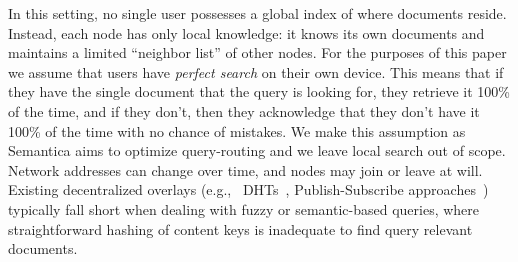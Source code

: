 \documentclass[10pt,journal]{IEEEtran}
\begin{document}
In this setting, no single user possesses a global index of where documents reside. Instead, each node has only local knowledge: it knows its own documents and maintains a limited ``neighbor list'' of other nodes. For the purposes of this paper we assume that users have \emph{perfect search} on their own device. This means that if they have the single document that the query is looking for, they retrieve it 100\% of the time, and if they don't, then they acknowledge that they don't have it 100\% of the time with no chance of mistakes. We make this assumption as Semantica aims to optimize query-routing and we leave local search out of scope. Network addresses can change over time, and nodes may join or leave at will. Existing decentralized overlays (e.g., \ DHTs~\cite{stoica2003chord}, Publish-Subscribe approaches~\cite{vansteen2018distributed}) typically fall short when dealing with fuzzy or semantic-based queries, where straightforward hashing of content keys is inadequate to find query relevant documents.
\end{document}
